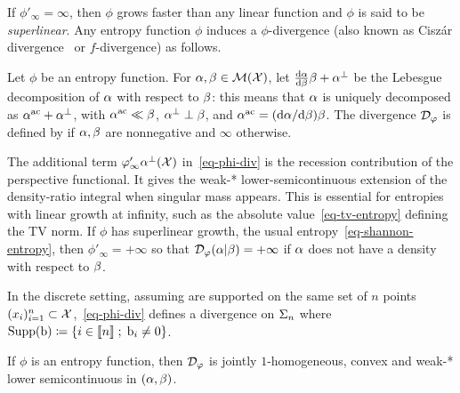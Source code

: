 If $\phi'_\infty = \infty$, then $\phi$ grows faster than any linear function and $\phi$ is said to be \emph{superlinear}. Any entropy function $\phi$ induces a $\phi$-divergence (also known as Cisz\'ar divergence~\cite{ciszar1967information,ali1966general} or $f$-divergence) as follows.

\begin{defn}
\label{def_divergence}
Let $\phi$ be an entropy function.
For $\alpha,\beta \in \mathcal{M}(\mathcal{X})$, let $\frac{\mathrm{d} \alpha}{\mathrm{d} \beta} \beta + \alpha^{\perp}$ be the Lebesgue decomposition of $\alpha$ with respect to $\beta$: this means that $\alpha$ is uniquely decomposed as $\alpha^{\mathrm{ac}}+\alpha^\perp$, with $\alpha^{\mathrm{ac}}\ll\beta$, $\alpha^\perp\perp\beta$, and $\alpha^{\mathrm{ac}}=(\mathrm{d}\alpha/\mathrm{d}\beta)\beta$. The divergence $\mathcal{D}_\varphi$ is defined by
if $\alpha,\beta$ are nonnegative and $\infty$ otherwise.
\end{defn}%

The additional term $\varphi'_\infty \alpha^{\perp}(\mathcal{X})$ in~\eqref{eq-phi-div} is the recession contribution of the perspective functional. It gives the weak-* lower-semicontinuous extension of the density-ratio integral when singular mass appears. This is essential for entropies with linear growth at infinity, such as the absolute value~\eqref{eq-tv-entropy} defining the TV norm. If $\phi$ has superlinear growth, \eg the usual entropy~\eqref{eq-shannon-entropy}, then $\phi'_\infty=+\infty$ so that $\mathcal{D}_\varphi (\alpha|\beta) = +\infty$ if $\alpha$ does not have a density with respect to $\beta$.

In the discrete setting, assuming
are supported on the same set of $n$ points $(x_i)_{i=1}^n \subset \mathcal{X}$,~\eqref{eq-phi-div} defines a divergence on $\Sigma_n$
where $\operatorname{Supp}(\mathrm{b}) \coloneqq \left\{ i \in \llbracket n\rrbracket \;;\;  \mathrm{b}_i \neq 0  \right\}$.


\begin{proposition}
If $\phi$ is an entropy function, then $\mathcal{D}_\varphi$ is jointly $1$-homogeneous, convex and weak-* lower semicontinuous in $(\alpha,\beta)$.
\end{proposition}

